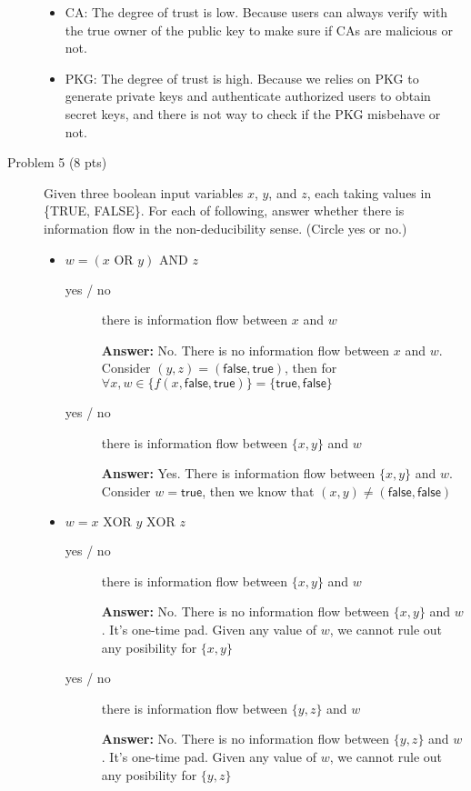 \documentclass[11pt]{article}
\newcommand{\ans}[1]{\begin{mdframed}\textbf{Answer: }#1\end{mdframed}}
\begin{document}
\begin{description}
{\begin{enumerate}
\begin{itemize}
       \item CA: The degree of trust is low. Because users can always verify with the true owner of the public key to make sure if CAs are malicious or not.
       \item PKG: The degree of trust is high. Because we relies on PKG to generate private keys and authenticate authorized users to obtain secret keys, and there is not way to check if the PKG misbehave or not.
    \end{itemize}
 \end{enumerate}
 }
 \item[Problem 5 (8 pts)]
Given three boolean input variables $x$, $y$, and $z$, each taking values in \{TRUE, FALSE\}.  For each of following, answer whether there is information flow in the non-deducibility sense.  (Circle yes or no.)

\begin{itemize}
 \item $w=(x \mbox{ OR } y) \mbox{ AND } z$
\begin{description}
 \item[yes / no~] there is information flow between $x$ and $w$
 \ans{ No. There is no information flow between $x$ and $w$.
 Consider $(y,z)=(\mathsf{false,true})$, then for $\forall x, w\in \{f(x,\mathsf{false,true})\} = \{\mathsf{true,false}\}$
 }
 \item[yes / no~] there is information flow between $\{x,y\}$ and $w$
 \ans{
 Yes. There is information flow between $\{x,y\}$ and $w$. Consider $w=\mathsf{true}$,  then we know that $(x,y) \neq (\mathsf{false,false})$
 }
\end{description}

 \item $w=x \mbox{ XOR } y  \mbox{ XOR } z$
\begin{description}
 \item[yes / no~] there is information flow between $\{x,y\}$ and $w$
 \ans{
 No. There is no information flow between $\{x,y\}$ and $w$. It's one-time pad. Given any value of $w$, we cannot rule out any posibility for $\{x,y\}$
 }
 \item[yes / no~] there is information flow between $\{y,z\}$ and $w$\\
 \ans{
 No. There is no information flow between $\{y,z\}$ and $w$. It's one-time pad. Given any value of $w$, we cannot rule out any posibility for $\{y,z\}$ 
 }
\end{description}
\end{itemize}


\end{description}
\end{document}
